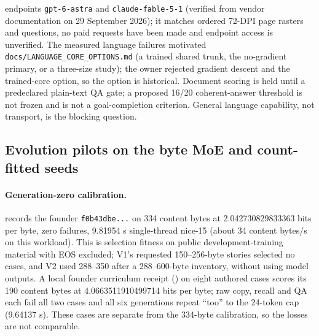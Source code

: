 \documentclass[11pt]{article}
\begin{document}
endpoints \texttt{gpt-6-astra} and \texttt{claude-fable-5-1} (verified from vendor documentation on
29 September 2026); it matches ordered 72-DPI page rasters and questions, no paid requests have been made and endpoint access is unverified. The measured
language failures motivated \texttt{docs/LANGUAGE\_CORE\_OPTIONS.md} (a trained shared trunk, the
no-gradient primary, or a three-size study); the owner rejected gradient descent and the trained-core
option, so the option is historical. Document scoring is held until a predeclared plain-text QA gate;
a proposed 16/20 coherent-answer threshold is not frozen and is not a goal-completion criterion.
General language capability, not transport, is the blocking question.

\subsection{Evolution pilots on the byte MoE and count-fitted seeds}\label{sec:evolang}
\paragraph{Generation-zero calibration.}  records the
founder \texttt{f0b43dbe...} on 334 content bytes at 2.042730829833363 bits per byte, zero
failures, 9.81954 s single-thread nice-15 (about 34 content bytes/s on this workload). This is
selection fitness on public development-training material with EOS excluded; V1's requested
150--256-byte stories selected no cases, and V2 used 288--350 after a 288--600-byte inventory,
without using model outputs. A local founder curriculum receipt
() on eight authored cases scores its 190
content bytes at 4.0663511910499714 bits per byte; raw copy, recall and QA each fail all two
cases and all six generations repeat ``too'' to the 24-token cap (9.64137 s). These cases are
separate from the 334-byte calibration, so the losses are not comparable.
\end{document}
